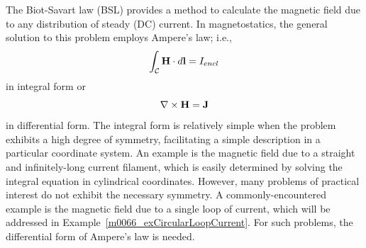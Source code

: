 

\label{m0066_Biot-Savart} %

The Biot-Savart law (BSL) provides a method to calculate the magnetic field due to any distribution of steady (DC) current.
In magnetostatics, the general solution to this problem employs Ampere's law; 
i.e.,
%
\begin{equation}
\int_{\mathcal C} {\bf H} \cdot d{\bf l} = I_{encl} 
\end{equation}
%
in integral form or 
%
\begin{equation}
\nabla \times {\bf H} = {\bf J} 
\end{equation}
%
in differential form.
The integral form is relatively simple when the problem exhibits a high degree of symmetry, facilitating a simple description in a particular coordinate system.  
An example is the magnetic field due to a straight and infinitely-long current filament, which is easily determined by solving the integral equation in cylindrical coordinates.  
However, many problems of practical interest do not exhibit the necessary symmetry.
A commonly-encountered example is the magnetic field due to a single loop of current, which will be addressed in Example~\ref{m0066_exCircularLoopCurrent}.
For such problems, the differential form of Ampere's law is needed.

